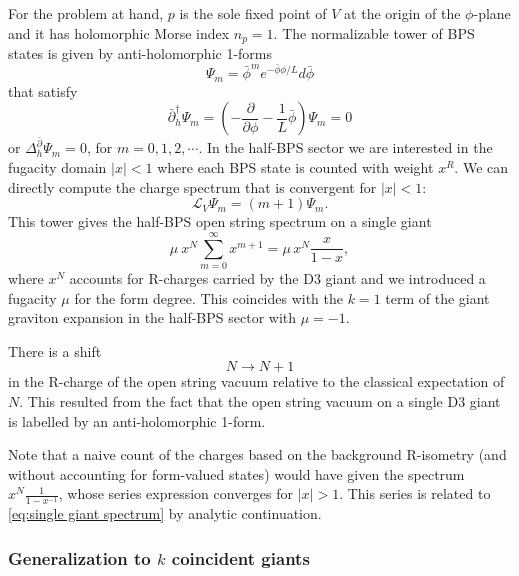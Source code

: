 \documentclass[a4paper,12pt]{article}
\begin{document}
For the problem at hand, $p$ is the sole fixed point of $V$ at the origin of the $\phi$-plane and it has holomorphic Morse index $n_p = 1$. The normalizable tower of BPS states is given by anti-holomorphic 1-forms
\begin{equation}
\Psi_m = \bar\phi^m e^{-\bar{\phi}\phi  / L} d\bar{\phi}
\end{equation}
that satisfy
\begin{equation}
\bar\partial_h^\dag \Psi_m = \left( - \frac{\partial}{\partial \phi} - \frac{1}{L} \bar\phi \right) \Psi_m = 0
\end{equation}
or $\Delta_h^{\bar\partial} \Psi_m = 0$, for $m=0,1,2, \cdots$. In the half-BPS sector we are interested in the fugacity domain $|x|<1$ where each BPS state is counted with weight $x^R$. We can directly compute the charge spectrum that is convergent for $|x|<1$:
\begin{equation}
\mathcal{L}_V \Psi_m = (m+1) \Psi_m.
\end{equation}
This tower gives the half-BPS open string spectrum on a single giant
\begin{equation} \label{eq:single giant spectrum}
\mu \ x^N \sum_{m=0}^\infty x^{m+1} = \mu \, x^N \frac{x}{1-x},
\end{equation}
where $x^N$ accounts for R-charges carried by the D3 giant and we introduced a fugacity $\mu$ for the form degree. This coincides with the $k=1$ term of the giant graviton expansion in the half-BPS sector with $\mu = -1$.

There is a shift
\begin{equation}
N \to N+1
\end{equation}
in the R-charge of the open string vacuum relative to the classical expectation of $N$. This resulted from the fact that the open string vacuum on a single D3 giant is labelled by an anti-holomorphic 1-form.

Note that a naive count of the charges based on the background R-isometry (and without accounting for form-valued states) would have given the spectrum $x^N \frac{1}{1-x^{-1}}$, whose series expression converges for $|x|>1$. This series is related to \eqref{eq:single giant spectrum} by analytic continuation.

\subsubsection{Generalization to $k$ coincident giants} \label{subsubsec:kgiants}
\end{document}

